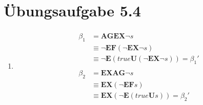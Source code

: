 \documentclass[a4paper]{scrartcl}
\begin{document}
\section*{Übungsaufgabe 5.4}
\begin{enumerate}
    \item
        \begin{align}
            \begin{split}
                \beta_1 &= \textbf{AGEX} \lnot s \\
                &\equiv \lnot \textbf{EF} (\lnot \textbf{EX} \lnot s) \\
                &\equiv \lnot \textbf{E} (true \textbf{U} (\lnot \textbf{EX} \lnot s)) = \beta_1'
            \end{split} \\
            \begin{split}
                \beta_2 &= \textbf{EXAG} \lnot s \\
                &\equiv \textbf{EX} (\lnot \textbf{EF} s) \\
                &\equiv \textbf{EX} (\lnot \textbf{E} (true \textbf{U} s)) = \beta_2'
            \end{split}
        \end{align}
        


\end{enumerate}
\end{document}
